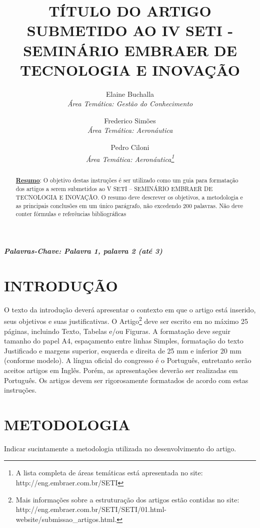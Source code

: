 \documentclass[]{seti2}
\title{TÍTULO DO ARTIGO SUBMETIDO AO IV SETI - SEMINÁRIO EMBRAER DE TECNOLOGIA E INOVAÇÃO}
\author{
					Elaine Buchalla\\
					{\normalsize\itshape Área Temática: Gestão do Conhecimento }\\
					\and
					Frederico Simões\\
					{\normalsize\itshape Área Temática: Aeronáutica}\\
					\and
					Pedro Ciloni\\
					{\normalsize\itshape Área Temática: Aeronáutica\footnote{\scriptsize{A lista completa de áreas temáticas está apresentada no site: \textcolor[rgb]{0,0,1}{http://eng.embraer.com.br/SETI}}}}\\
				}
\begin{document}
\maketitle

\begin{abstract}
		\underline{\textbf{Resumo}}: O objetivo destas instruções é ser utilizado como um guia para formatação dos artigos a serem submetidos ao V SETI – SEMINÁRIO EMBRAER DE TECNOLOGIA E INOVAÇÃO. O resumo deve descrever os objetivos, a metodologia e as principais conclusões em um único parágrafo, não excedendo 200 palavras. Não deve conter fórmulas e referências bibliográficas
\end{abstract}

\textbf{\textit{Palavras-Chave: Palavra 1, palavra 2 (até 3)}}

\section{INTRODUÇÃO}
  O texto da introdução deverá apresentar o contexto em que o artigo está inserido, seus objetivos e suas justificativas.
	O Artigo\footnote{\scriptsize{Mais informações sobre a estruturação dos artigos estão contidas no site: \textcolor[rgb]{0,0,1}{http://eng.embraer.com.br/SETI/SETI/01.html-website/submissao\_artigos.html}.}} deve ser escrito em no máximo 25 páginas, incluindo Texto, Tabelas e/ou Figuras. 
	A formatação deve seguir tamanho do papel A4, espaçamento entre linhas Simples, formatação do texto Justificado e margens superior, esquerda e direita de 25 mm e inferior 20 mm  (conforme modelo).
	A língua oficial do congresso é o Português, entretanto serão aceitos artigos em Inglês. Porém, as apresentações deverão ser realizadas em Português. 
	Os artigos devem ser rigorosamente formatados de acordo com estas instruções.

\section{METODOLOGIA}
Indicar sucintamente a metodologia utilizada no desenvolvimento do artigo.

\end{document}
